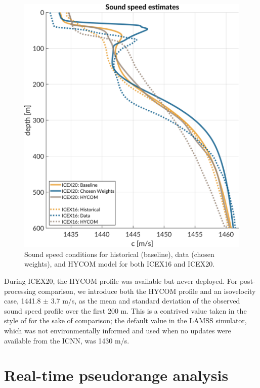 \begin{figure}[h!]
	\centering
	\includegraphics[width=\reprintcolumnwidth]{figs/ssp-gvel-icex20-icex16.pdf}
	\caption{Sound speed conditions for historical (baseline), data (chosen weights), and HYCOM model for both ICEX16 and ICEX20.}
	\label{fig:sspExpectation}
\end{figure}

During ICEX20, the HYCOM profile was available but never deployed. 
For post-processing comparison, we introduce both the HYCOM profile and an isovelocity case, 1441.8 $\pm$ 3.7 m/s, as the mean and standard deviation of the observed sound speed profile over the first 200 m.
This is a contrived value taken in the style of \citet{Graupe2019} for the sake of comparison; the default value in the LAMSS simulator, which was not environmentally informed and used when no updates were available from the ICNN, was 1430 m/s.

\clearpage
\section{\label{sec:realtime} Real-time pseudorange analysis}

